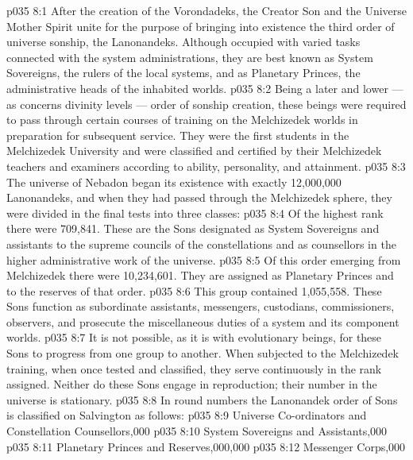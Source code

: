 \vs p035 8:1 After the creation of the Vorondadeks, the Creator Son and the Universe Mother Spirit unite for the purpose of bringing into existence the third order of universe sonship, the Lanonandeks. Although occupied with varied tasks connected with the system administrations, they are best known as System Sovereigns, the rulers of the local systems, and as Planetary Princes, the administrative heads of the inhabited worlds.
\vs p035 8:2 Being a later and lower --- as concerns divinity levels --- order of sonship creation, these beings were required to pass through certain courses of training on the Melchizedek worlds in preparation for subsequent service. They were the first students in the Melchizedek University and were classified and certified by their Melchizedek teachers and examiners according to ability, personality, and attainment.
\vs p035 8:3 The universe of Nebadon began its existence with exactly 12,000,000 Lanonandeks, and when they had passed through the Melchizedek sphere, they were divided in the final tests into three classes:
\vs p035 8:4 \bibnobreakspace {} Of the highest rank there were 709,841. These are the Sons designated as System Sovereigns and assistants to the supreme councils of the constellations and as counsellors in the higher administrative work of the universe.
\vs p035 8:5 \bibnobreakspace {} Of this order emerging from Melchizedek there were 10,234,601. They are assigned as Planetary Princes and to the reserves of that order.
\vs p035 8:6 \bibnobreakspace {} This group contained 1,055,558. These Sons function as subordinate assistants, messengers, custodians, commissioners, observers, and prosecute the miscellaneous duties of a system and its component worlds.
\vs p035 8:7 \pc It is not possible, as it is with evolutionary beings, for these Sons to progress from one group to another. When subjected to the Melchizedek training, when once tested and classified, they serve continuously in the rank assigned. Neither do these Sons engage in reproduction; their number in the universe is stationary.
\vs p035 8:8 In round numbers the Lanonandek order of Sons is classified on Salvington as follows:
\vs p035 8:9 \pc Universe Co\hyp{}ordinators and Constellation Counsellors,000
\vs p035 8:10 System Sovereigns and Assistants,000
\vs p035 8:11 Planetary Princes and Reserves,000,000
\vs p035 8:12 Messenger Corps,000
